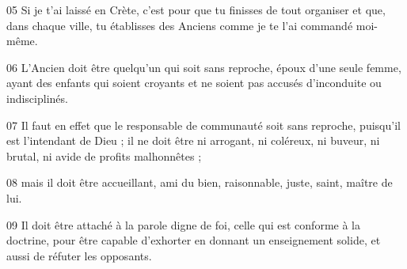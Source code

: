 
05 Si je t’ai laissé en Crète, c’est pour que tu finisses de tout organiser et que, dans chaque ville, tu établisses des Anciens comme je te l’ai commandé moi-même.

06 L’Ancien doit être quelqu’un qui soit sans reproche, époux d’une seule femme, ayant des enfants qui soient croyants et ne soient pas accusés d’inconduite ou indisciplinés.

07 Il faut en effet que le responsable de communauté soit sans reproche, puisqu’il est l’intendant de Dieu ; il ne doit être ni arrogant, ni coléreux, ni buveur, ni brutal, ni avide de profits malhonnêtes ;

08 mais il doit être accueillant, ami du bien, raisonnable, juste, saint, maître de lui.

09 Il doit être attaché à la parole digne de foi, celle qui est conforme à la doctrine, pour être capable d’exhorter en donnant un enseignement solide, et aussi de réfuter les opposants.
